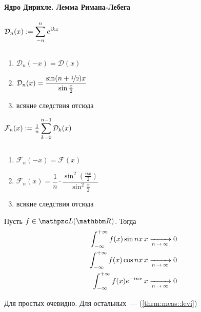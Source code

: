 \documentclass[12pt,draft,timbord]{longnotes}
\begin{document}
\paragraph{Ядро Дирихле. Лемма Римана-Лебега}
\label{par:fourier::dirker}

\begin{defn}\label{defn:fourier::dirker::dir}
  $\mathcal D_n(x) := \displaystyle\sum_{-n}^n e^{ikx}$
\end{defn}
\begin{lem}\label{lem:fourier::dirker::dir}
  ${}$
  \begin{enumerate}
    \item $\mathcal D_n(-x) = \mathcal D(x)$
    \item $\mathcal D_n(x) = \dfrac{\sin(n+\nicefrac{1}{2})x}{\sin \frac x 2}$
    \item всякие следствия отсюда
  \end{enumerate}
\end{lem}
\begin{defn}\label{defn:fourier::dirker::fey}
  $\mathcal F_n(x) := \frac{1}{n} \displaystyle\sum_{k=0}^{n-1} \mathcal D_k(x)$
\end{defn}
\begin{lem}\label{lem:fourier::dirker::fey}
  ${}$
  \begin{enumerate}
    \item $\mathcal F_n(-x) = \mathcal F(x)$
    \item $\mathcal F_n(x)= \dfrac1 n \cdot\dfrac{\sin^2\left(\frac{nx}{2}\right)}{\sin^2\frac x 2}$
    \item всякие следствия отсюда
  \end{enumerate}
\end{lem}

\begin{lem}\label{lem:fourier::dirker::rimleb}
  Пусть $f\in \summb(\R)$. Тогда
  \begin{align*}
    \intR f(x) \sin nx \, x &\xto{n\to \infty} 0 \\
    \intR f(x) \cos nx \, x &\xto{n\to \infty} 0\\
    \intR f(x) e^{-inx} \, x &\xto{n\to \infty} 0\\
  \end{align*}
\end{lem}
\begin{lproof}
  Для простых очевидно. Для остальных~--- (\ref{thrm:meas::levi})
\end{lproof}
\end{document}
